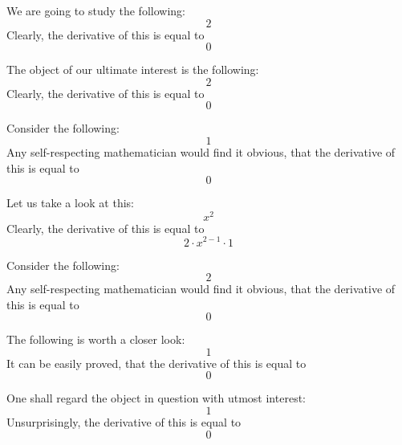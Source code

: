 \documentclass{article}
\begin{document}
We are going to study the following:
\begin{equation}
2 
\end{equation}
Clearly, the derivative of this is equal to
\begin{equation}
0 
\end{equation}

The object of our ultimate interest is the following:
\begin{equation}
2 
\end{equation}
Clearly, the derivative of this is equal to
\begin{equation}
0 
\end{equation}

Consider the following:
\begin{equation}
1 
\end{equation}
Any self-respecting mathematician would find it obvious, that the derivative of this is equal to
\begin{equation}
0 
\end{equation}

Let us take a look at this:
\begin{equation}
x ^{2 } 
\end{equation}
Clearly, the derivative of this is equal to
\begin{equation}
2 \cdot x ^{2 - 1 } \cdot 1 
\end{equation}

Consider the following:
\begin{equation}
2 
\end{equation}
Any self-respecting mathematician would find it obvious, that the derivative of this is equal to
\begin{equation}
0 
\end{equation}

The following is worth a closer look:
\begin{equation}
1 
\end{equation}
It can be easily proved, that the derivative of this is equal to
\begin{equation}
0 
\end{equation}

One shall regard the object in question with utmost interest:
\begin{equation}
1 
\end{equation}
Unsurprisingly, the derivative of this is equal to
\begin{equation}
0 
\end{equation}
\end{document}
